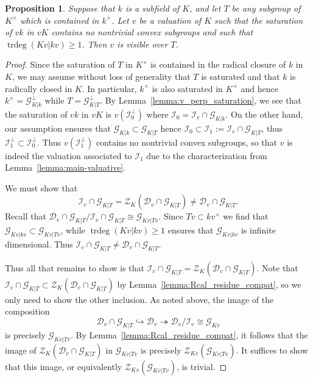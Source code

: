 \documentclass[12pt]{amsart}
\newcommand{\trdeg}{\operatorname{trdeg}}
\newcommand{\Zcal}{\mathcal{Z}}
\newcommand{\Gcal}{\mathcal{G}}
\newcommand{\Dcal}{\mathcal{D}}
\newcommand{\Ical}{\mathcal{I}}
\newtheorem{proposition}[theorem]{Proposition}
\theoremstyle{definition}
\begin{document}
\begin{proposition}\label{proposition:visible_of_trdeg_ge_one}
  Suppose that $k$ is a subfield of $K$, and let $T$ be any subgroup of $K^{\times}$ which is contained in $k^{\times}$.
  Let $v$ be a valuation of $K$ such that the saturation of $vk$ in $vK$ contains no nontrivial convex subgroups and such that $\trdeg(Kv|kv) \geq 1$.
  Then $v$ is visible over $T$.
\end{proposition}
\begin{proof}
  Since the saturation of $T$ in $K^{\times}$ is contained in the radical closure of $k$ in $K$, we may assume without loss of generality that $T$ is saturated and that $k$ is radically closed in $K$.
  In particular, $k^{\times}$ is also saturated in $K^{\times}$ and hence $k^{\times} = \Gcal_{K|k}^{\perp}$ while $T = \Gcal_{K|T}^{\perp}$.
  By Lemma~\ref{lemma:v_perp_saturation}, we see that the saturation of $vk$ in $vK$ is $v(\Ical_{0}^{\perp})$ where $\Ical_{0} = \Ical_{v} \cap \Gcal_{K|k}$.
  On the other hand, our assumption ensures that $\Gcal_{K|k} \subset \Gcal_{K|T}$ hence $\Ical_{0} \subset \Ical_{1} := \Ical_{v} \cap \Gcal_{K|T}$, thus $\Ical_{1}^{\perp} \subset \Ical_{0}^{\perp}$.
  Thus $v(\Ical_{1}^{\perp})$ contains no nontrivial convex subgroups, so that $v$ is indeed the valuation associated to $\Ical_{1}$ due to the characterization from Lemma~\ref{lemma:main-valuative}.

  We must show that
  \[ \Ical_{v} \cap \Gcal_{K|T} = \Zcal_{K}(\Dcal_{v} \cap \Gcal_{K|T}) \neq \Dcal_{v} \cap \Gcal_{K|T}. \]
  Recall that $\Dcal_{v} \cap \Gcal_{K|T} / \Ical_{v} \cap \Gcal_{K|T} \cong \Gcal_{Kv|Tv}$.
  Since $Tv \subset kv^{\times}$ we find that $\Gcal_{Kv|kv} \subset \Gcal_{Kv|Tv}$, while $\trdeg(Kv|kv) \geq 1$ ensures that $\Gcal_{Kv|kv}$ is infinite dimensional.
  Thus $\Ical_{v} \cap \Gcal_{K|T} \neq \Dcal_{v} \cap \Gcal_{K|T}$.

  Thus all that remains to show is that $\Ical_{v} \cap \Gcal_{K|T} = \Zcal_{K}(\Dcal_{v} \cap \Gcal_{K|T})$.
  Note that $\Ical_{v} \cap \Gcal_{K|T} \subset \Zcal_{K}(\Dcal_{v} \cap \Gcal_{K|T})$ by Lemma~\ref{lemma:Rcal_residue_compat}, so we only need to show the other inclusion.
  As noted above, the image of the composition
  \[ \Dcal_{v} \cap \Gcal_{K|T} \hookrightarrow \Dcal_{v} \twoheadrightarrow \Dcal_{v}/\Ical_{v} \cong \Gcal_{Kv} \]
  is precisely $\Gcal_{Kv|Tv}$.
  By Lemma~\ref{lemma:Rcal_residue_compat}, it follows that the image of $\Zcal_{K}(\Dcal_{v} \cap \Gcal_{K|T})$ in $\Gcal_{Kv|Tv}$ is precisely $\Zcal_{Kv}(\Gcal_{Kv|Tv})$.
  It suffices to show that this image, or equivalently $\Zcal_{Kv}(\Gcal_{Kv|Tv})$, is trivial.


\end{proof}
\end{document}
